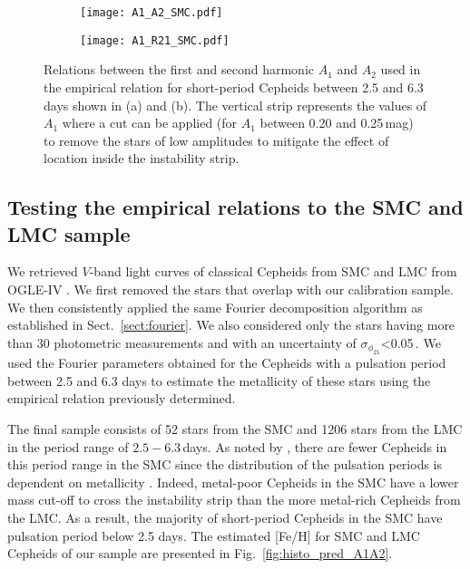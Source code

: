 \documentclass[article]{aa} %
\begin{document}
\begin{figure*}%

\begin{subfigure}{0.52\textwidth}
\texttt{[image: A1\_A2\_SMC.pdf]}
\caption{} \label{fig:A1_A2}
\end{subfigure}\hspace*{\fill}
\begin{subfigure}{0.52\textwidth}
\texttt{[image: A1\_R21\_SMC.pdf]}
\caption{} \label{fig:R21_A1}
\end{subfigure}
\caption{ Relations between the first and second harmonic $A_1$ and $A_2$ used in the empirical relation for short-period Cepheids between 2.5 and 6.3 days shown in (a) and (b). The vertical strip represents the values of $A_1$ where a cut can be applied (for $A_1$ between 0.20 and 0.25$\,$mag) to remove the stars of low amplitudes to mitigate the effect of location inside the instability strip.\label{fig:A1A2HISTO}}
\end{figure*}



\subsection{Testing the empirical relations to the SMC and LMC sample}\label{sect:validity}

We retrieved $V$-band light curves of classical Cepheids from SMC and LMC from OGLE-IV \citep{Udalski2015,Udalski2018,Soszynski2017}. We first removed the stars that overlap with our calibration sample. We then consistently applied the same Fourier decomposition algorithm as established in Sect.~\ref{sect:fourier}. We also considered only the stars having more than 30 photometric measurements and with an uncertainty of $\sigma_{\phi_{21}}$<0.05$\,$. We used the Fourier parameters obtained for the Cepheids with a pulsation period between 2.5 and 6.3 days to estimate the metallicity of these stars using the empirical relation previously determined. 

 The final sample consists of 52 stars from the SMC and 1206 stars from the LMC in the period range of $2.5-6.3\,$days. As noted by \cite{Soszynski2008,Soszynski2010}, there are fewer Cepheids in this period range in the SMC since the distribution of the pulsation periods is dependent on metallicity \citep{Becker1977,Bono2000}. Indeed, metal-poor Cepheids in the SMC have a lower mass cut-off to cross the instability strip than the more metal-rich Cepheids from the LMC. As a result, the majority of short-period Cepheids in the SMC have pulsation period below 2.5 days. The estimated [Fe/H] for SMC and LMC Cepheids of our sample are presented in Fig.~\ref{fig:histo_pred_A1A2}. 
\end{document}
